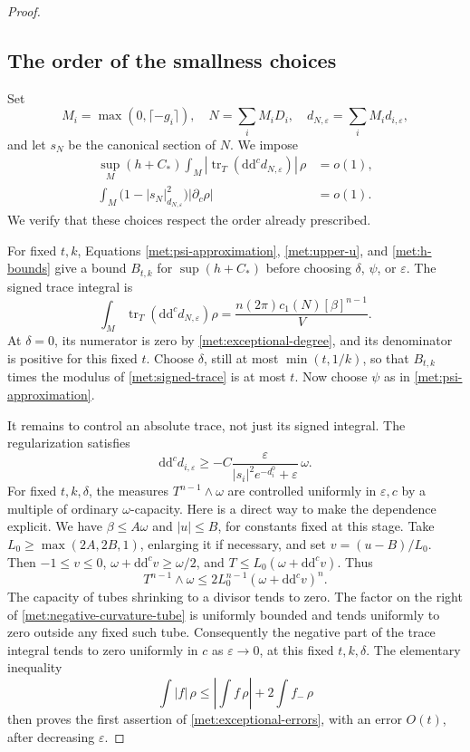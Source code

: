 \documentclass[11pt,letterpaper]{article}
\newcommand{\ddc}{\mathrm{d}\mathrm{d}^{c}}
\DeclareMathOperator{\tr}{tr}
\theoremstyle{definition}
\theoremstyle{remark}
\begin{document}
\begin{proof}
\subsection*{The order of the smallness choices}

Set
\[
 M_i=\max(0,\lceil-g_i\rceil),
 \quad N=\sum_i M_iD_i,
 \quad d_{N,\varepsilon}=\sum_i M_i d_{i,\varepsilon},
\]
and let \(s_N\) be the canonical section of \(N\).  We impose
\begin{equation}
 \label{met:exceptional-errors}
 \begin{split}
 \sup_M(h+C_*)\int_M
       |\tr_T(\ddc d_{N,\varepsilon})|\,\rho&=o(1),\\
 \int_M\bigl(1-|s_N|_{d_{N,\varepsilon}}^2\bigr)
       |\partial_c\rho|&=o(1).
 \end{split}
\end{equation}
We verify that these choices respect the order already prescribed.

For fixed \(t,k\), Equations \eqref{met:psi-approximation},
\eqref{met:upper-u}, and \eqref{met:h-bounds} give a bound
\(B_{t,k}\) for \(\sup(h+C_*)\) before choosing \(\delta\),
\(\psi\), or \(\varepsilon\).  The signed trace integral is
\begin{equation}
 \label{met:signed-trace}
 \int_M\tr_T(\ddc d_{N,\varepsilon})\rho
   =\frac{n(2\pi)c_1(N)[\beta]^{n-1}}V.
\end{equation}
At \(\delta=0\), its numerator is zero by
\eqref{met:exceptional-degree}, and its denominator is positive for
this fixed \(t\).  Choose \(\delta\), still at most \(\min(t,1/k)\),
so that \(B_{t,k}\) times the modulus of
\eqref{met:signed-trace} is at most \(t\).  Now choose \(\psi\) as in
\eqref{met:psi-approximation}.

It remains to control an absolute trace, not just its signed integral.
The regularization satisfies
\begin{equation}
 \label{met:negative-curvature-tube}
 \ddc d_{i,\varepsilon}
 \geq-C\frac{\varepsilon}
 {|s_i|^2e^{-d_i^0}+\varepsilon}\,\omega.
\end{equation}
For fixed \(t,k,\delta\), the measures
\(T^{n-1}\wedge\omega\) are controlled uniformly in
\(\varepsilon,c\) by a multiple of ordinary \(\omega\)-capacity.
Here is a direct way to make the dependence explicit.  We have
\(\beta\leq A\omega\) and \(|u|\leq B\), for constants fixed at this
stage.  Take \(L_0\geq\max(2A,2B,1)\), enlarging it if necessary,
and set \(v=(u-B)/L_0\).  Then \(-1\leq v\leq0\),
\(\omega+\ddc v\geq\omega/2\), and
\(T\leq L_0(\omega+\ddc v)\).  Thus
\[
 T^{n-1}\wedge\omega
 \leq2L_0^{n-1}(\omega+\ddc v)^n.
\]
The capacity of tubes shrinking to a divisor tends to zero.  The
factor on the right of \eqref{met:negative-curvature-tube} is uniformly
bounded and tends uniformly to zero outside any fixed such tube.
Consequently the negative part of the trace integral tends to zero
uniformly in \(c\) as \(\varepsilon\to0\), at this fixed
\(t,k,\delta\).  The elementary inequality
\[
 \int|f|\,\rho
 \leq\left|\int f\,\rho\right|+2\int f_-\,\rho
\]
then proves the first assertion of \eqref{met:exceptional-errors},
with an error \(O(t)\), after decreasing \(\varepsilon\).


\end{proof}
\end{document}
